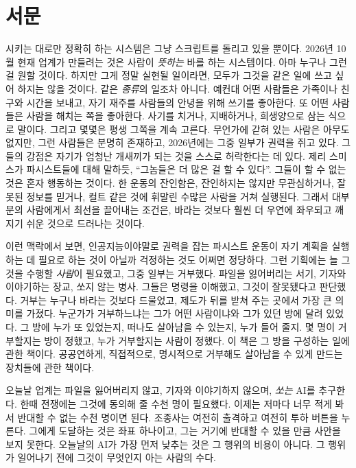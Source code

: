 \chapter*{서문}
시키는 대로만 정확히 하는 시스템은 그냥 스크립트를 돌리고 있을 뿐이다. 2026년 10월 현재 업계가 만들려는 것은 사람이 \emph{뜻하는} 바를 하는 시스템이다. 아마 누구나 그런 걸 원할 것이다. 하지만 그게 정말 실현될 일이라면, 모두가 그것을 같은 일에 쓰고 싶어 하지는 않을 것이다. 같은 \emph{종류}의 일조차 아니다. 예컨대 어떤 사람들은 가족이나 친구와 시간을 보내고, 자기 재주를 사람들의 안녕을 위해 쓰기를 좋아한다. 또 어떤 사람들은 사람을 해치는 쪽을 좋아한다. 사기를 치거나, 지배하거나, 희생양으로 삼는 식으로 말이다. 그리고 몇몇은 평생 그쪽을 계속 고른다. 무언가에 갇혀 있는 사람은 아무도 없지만, 그런 사람들은 분명히 존재하고, 2026년에는 그중 일부가 권력을 쥐고 있다. 그들의 강점은 자기가 엄청난 개새끼가 되는 것을 스스로 허락한다는 데 있다. 제리 스미스가 파시스트들에 대해 말하듯, “그놈들은 더 많은 걸 할 수 있다”\autocite{rickandmorty2023}. 그들이 할 수 없는 것은 혼자 행동하는 것이다. 한 운동의 잔인함은, 잔인하지는 않지만 무관심하거나, 잘못된 정보를 믿거나, 컬트 같은 것에 휘말린 수많은 사람을 거쳐 실행된다. 그래서 대부분의 사람에게서 최선을 끌어내는 조건은, 바라는 것보다 훨씬 더 우연에 좌우되고 깨지기 쉬운 것으로 드러나는 것이다.

이런 맥락에서 보면, 인공지능이야말로 권력을 잡는 파시스트 운동이 자기 계획을 실행하는 데 필요로 하는 것이 아닐까 걱정하는 것도 어쩌면 정당하다. 그런 기획에는 늘 그것을 수행할 \emph{사람}이 필요했고, 그중 일부는 거부했다. 파일을 잃어버리는 서기, 기자와 이야기하는 장교, 쏘지 않는 병사. 그들은 명령을 이해했고, 그것이 잘못됐다고 판단했다. 거부는 누구나 바라는 것보다 드물었고, 제도가 뒤를 받쳐 주는 곳에서 가장 큰 의미를 가졌다. 누군가가 거부하느냐는 그가 어떤 사람이냐와 그가 있던 방에 달려 있었다. 그 방에 누가 또 있었는지, 떠나도 살아남을 수 있는지, 누가 들어 줄지. 몇 명이 거부할지는 방이 정했고, 누가 거부할지는 사람이 정했다. 이 책은 그 방을 구성하는 일에 관한 책이다. 공공연하게, 직접적으로, 명시적으로 거부해도 살아남을 수 있게 만드는 장치들에 관한 책이다.

오늘날 업계는 파일을 잃어버리지 않고, 기자와 이야기하지 않으며, \emph{쏘는} AI를 추구한다. 한때 전쟁에는 그것에 동의해 줄 수천 명이 필요했다. 이제는 저마다 너무 적게 봐서 반대할 수 없는 수천 명이면 된다. 조종사는 여전히 출격하고 여전히 투하 버튼을 누른다. 그에게 도달하는 것은 좌표 하나이고, 그는 거기에 반대할 수 있을 만큼 사안을 보지 못한다. 오늘날의 AI가 가장 먼저 낮추는 것은 그 행위의 비용이 아니다. 그 행위가 일어나기 전에 그것이 무엇인지 아는 사람의 수다.

